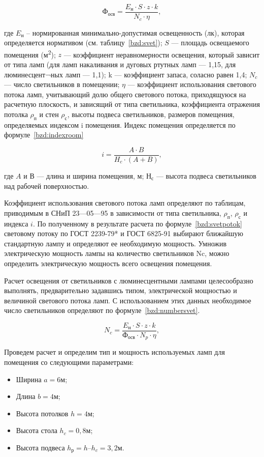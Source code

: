 \begin{equation}\label{bzd:svetpotok}
Ф_{осв}=\frac{E_н \cdot S \cdot z \cdot k}{N_c \cdot \eta},
\end{equation}

где $E_н$ – нормированная минимально-допустимая освещенность (лк), которая определяется нормативом (см. таблицу~\ref{bzd:svet}); $S$ — площадь освещаемого помещения (м\textsuperscript{2}); $z$ — коэффициент неравномерности освещения, который зависит от типа ламп (для ламп накаливания и дуговых ртутных ламп — 1,15, для люминесцент¬ных ламп — 1,1); k — коэффициент запаса, соласно \cite{metodaBZD} равен 1,4; $N_c$ — число светильников в помещении; $\eta$ — коэффициент использования светового потока ламп, учитывающий долю общего светового потока, приходящуюся на расчетную плоскость, и зависящий от типа светильника, коэффициента отражения потолка $\rho_п$ и стен $\rho_с$, высоты подвеса светильников, размеров помещения, определяемых индексом i помещения. Индекс помещения определяется по формуле~\ref{bzd:indexroom}

\begin{equation}\label{bzd:indexroom}
i=\frac{A \cdot B }{H_c \cdot (A + B)},
\end{equation}

где $A$ и $В$ — длина и ширина помещения, м; $Н_с$ — высота подвеса светильников над рабочей поверхностью.

Коэффициент использования светового потока ламп определяют по таблицам, приводимым в СНиП 23—05—95 в зависимости от типа светильника, $\rho_п$, $\rho_с$ и индекса $i$.
По полученному в результате расчета по формуле~\ref{bzd:svetpotok} световому потоку по ГОСТ 2239-79* и ГОСТ 6825-91 выбирают ближайшую стандартную лампу и определяют ее необходимую мощность. Умножив электрическую мощность лампы на количество светильников Nc, можно определить электрическую мощность всего освещения помещения.

Расчет освещения от светильников с люминесцентными лампами целесообразно выполнять, предварительно задавшись типом, электрической мощностью и величиной светового потока ламп. С использованием этих данных необходимое число светильников определяют по формуле~\ref{bzd:numbersvet}.
 
\begin{equation}\label{bzd:numbersvet}
N_c =\frac{E_н \cdot S \cdot z \cdot k}{Ф_{осв} \cdot N_p \cdot \eta},
\end{equation}

Проведем расчет и определим тип и мощность используемых ламп для помещения со следующими параметрами:
\begin{itemize}
\item Ширина $a = 6 м$;
\item Длина	$b = 4 м$;
\item Высота потолков $h = 4 м$;
\item Высота стола $h_c = 0,8 м$;
\item Высота подвеса	$h_р = h – h_c = 3,2 м$.

\end{itemize}


